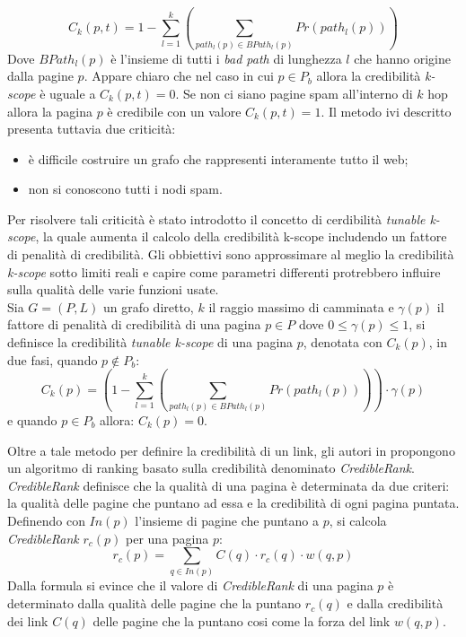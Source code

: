 \begin{equation}
 C_k(p,t)=1-\sum_{l=1}^k\left (\sum_{path_l(p)\in BPath_l(p)}Pr(path_l(p))\right )
\end{equation}
Dove \(BPath_l(p)\) è l'insieme di tutti i \textit{bad path} di lunghezza \(l\) che hanno origine dalla pagine \(p\). Appare chiaro che nel caso in cui \(p\in P_b\) allora la credibilità \textit{k-scope} è uguale a \(C_k(p,t)=0\). Se non ci siano pagine spam all'interno di \(k\) hop  allora la pagina \(p\) è credibile con un valore \(C_k(p,t)=1\). Il metodo ivi descritto presenta tuttavia due criticità:
\begin{itemize}
 \item è difficile costruire un grafo che rappresenti interamente tutto il web;
 \item non si conoscono tutti i nodi spam.
\end{itemize}
 Per risolvere tali criticità è stato introdotto il concetto di cerdibilità \textit{tunable k-scope}, la quale aumenta il calcolo della credibilità k-scope includendo un fattore di penalità di credibilità. Gli obbiettivi sono approssimare al meglio la credibilità \textit{k-scope} sotto limiti reali e capire come parametri differenti protrebbero influire sulla qualità delle varie funzioni usate. \\Sia \(G=(P,L)\) un grafo diretto, \(k\) il raggio massimo di camminata e \(\gamma(p)\) il fattore di penalità di credibilità di una pagina \(p\in P\) dove \(0\leq \gamma(p)\leq 1\), si definisce la credibilità \textit{tunable k-scope} di una pagina \(p\), denotata con \(C_k(p)\), in due fasi, quando \(p \not \in P_b\):
\begin{equation} 
C_k(p)=\left ( 1 -\sum_{l=1}^k \left ( \sum_{path_l(p)\in BPath_l(p)} Pr(path_l(p)) \right ) \right ) \cdot\gamma(p)
\end{equation}
e quando \(p\in P_b\) allora: \(C_k(p)=0\).

Oltre a tale metodo per definire la credibilità di un link, gli autori in \cite{Caverlee:2007:CWS:1281100.1281124} propongono un algoritmo di ranking  basato sulla credibilità denominato \textit{CredibleRank}. \textit{CredibleRank} definisce che la qualità di una pagina è determinata da due criteri: la qualità delle pagine che puntano ad essa e la credibilità di ogni pagina puntata. Definendo con \(In(p)\) l'insieme di pagine che puntano a \(p\), si calcola \textit{CredibleRank} \(r_c(p)\) per una pagina \(p\):
\begin{equation}
r_c(p)=\sum_{q\in In(p)}C(q)\cdot r_c(q)\cdot w(q,p)
\end{equation}
Dalla formula si evince che il valore di \textit{CredibleRank} di una pagina \(p\) è determinato dalla qualità delle pagine che la puntano \(r_c(q)\) e dalla credibilità dei link \(C(q)\) delle pagine che la puntano cosi come la forza del link \(w(q,p)\).

